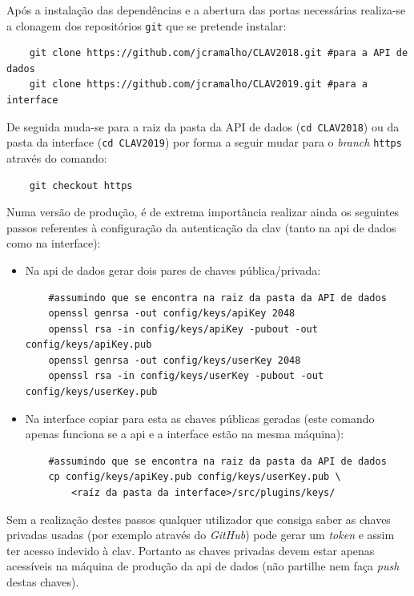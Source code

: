 Após a instalação das dependências e a abertura das portas necessárias realiza-se a clonagem dos repositórios \texttt{git} que se pretende instalar:
\begin{verbatim}
    git clone https://github.com/jcramalho/CLAV2018.git #para a API de dados
    git clone https://github.com/jcramalho/CLAV2019.git #para a interface
\end{verbatim}

De seguida muda-se para a raiz da pasta da API de dados (\verb|cd CLAV2018|) ou da pasta da interface (\verb|cd CLAV2019|) por forma a seguir mudar para o \textit{branch} \texttt{https} através do comando:

\begin{verbatim}
    git checkout https
\end{verbatim}

Numa versão de produção, é de extrema importância realizar ainda os seguintes passos referentes à configuração da autenticação da \acrshort{clav} (tanto na \acrshort{api} de dados como na interface):
\begin{itemize}
    \item Na \acrshort{api} de dados gerar dois pares de chaves pública/privada:
    \begin{verbatim}
    #assumindo que se encontra na raiz da pasta da API de dados
    openssl genrsa -out config/keys/apiKey 2048
    openssl rsa -in config/keys/apiKey -pubout -out config/keys/apiKey.pub
    openssl genrsa -out config/keys/userKey 2048
    openssl rsa -in config/keys/userKey -pubout -out config/keys/userKey.pub
    \end{verbatim}
    \item Na interface copiar para esta as chaves públicas geradas (este comando apenas funciona se a \acrshort{api} e a interface estão na mesma máquina):
    \begin{verbatim}
    #assumindo que se encontra na raiz da pasta da API de dados
    cp config/keys/apiKey.pub config/keys/userKey.pub \
        <raíz da pasta da interface>/src/plugins/keys/
    \end{verbatim}
\end{itemize}
Sem a realização destes passos qualquer utilizador que consiga saber as chaves privadas usadas (por exemplo através do \textit{GitHub}) pode gerar um \textit{token} e assim ter acesso indevido à \acrshort{clav}. Portanto as chaves privadas devem estar apenas acessíveis na máquina de produção da \acrshort{api} de dados (não partilhe nem faça \textit{push} destas chaves).


